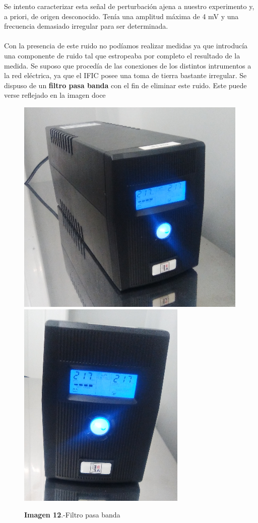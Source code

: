 \documentclass[11pt, a4paper]{article}
\begin{document}
\begin{itemize}
Se intento caracterizar esta señal de perturbación ajena a nuestro experimento y, a priori, de origen desconocido. Tenía una amplitud máxima de 4 mV y una frecuencia demasiado irregular para ser determinada. 

\paragraph {}
Con la presencia de este ruido no podíamos realizar medidas ya que introducía una componente de ruido tal que estropeaba por completo el resultado de la medida. Se suposo que procedía de las conexiones de los distintos intrumentos a la red eléctrica, ya que el IFIC posee una toma de tierra bastante irregular. Se dispuso de un \textbf{filtro pasa banda} con el fin de eliminar este ruido. Este puede verse reflejado en la imagen doce

\begin{figure}[htb]
\centering
{
\includegraphics[scale=0.2]{Filtro1.png} 
}
{
\includegraphics[scale=0.2]{Filtro2.png} 
}
\caption{\textbf{Imagen 12}.-Filtro pasa banda}
\end{figure} 


\end{itemize}
\end{document}
